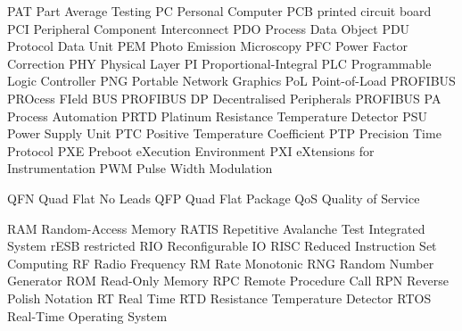 		{PAT}		{Part Average Testing}
			{PC}		{Personal Computer}
		{PCB}		{printed circuit board}
		{PCI}		{Peripheral Component Interconnect}
		{PDO}		{Process Data Object}
		{PDU}		{Protocol Data Unit}
		{PEM}		{Photo Emission Microscopy}
		{PFC}		{Power Factor Correction}
		{PHY}		{Physical Layer}
		{PI}		{Proportional-Integral}
		{PLC}		{Programmable Logic Controller}
		{PNG}		{Portable Network Graphics}
		{PoL}		{Point-of-Load}
	{PROFIBUS}	{PROcess FIeld BUS}
		{PROFIBUS DP}	{{} Decentralised Peripherals}
		{PROFIBUS PA}	{{} Process Automation}
		{PRTD}		{Platinum Resistance Temperature Detector}
		{PSU}		{Power Supply Unit}
		{PTC}		{Positive Temperature Coefficient}
		{PTP}		{Precision Time Protocol}
		{PXE}		{Preboot eXecution Environment}
		{PXI}		{{} eXtensions for Instrumentation}
		{PWM}		{Pulse Width Modulation}

		{QFN}		{Quad Flat No Leads}
		{QFP}		{Quad Flat Package}
		{QoS}		{Quality of Service}

		{RAM}		{Random-Access Memory}
		{RATIS}		{Repetitive Avalanche Test Integrated System}
		{rESB}		{restricted {}}
		{RIO}		{Reconfigurable {\acrshort{IO}}}
		{RISC}		{Reduced Instruction Set Computing}
			{RF}		{Radio Frequency}
			{RM}		{Rate Monotonic}
		{RNG}		{Random Number Generator}
		{ROM}		{Read-Only Memory}
		{RPC}		{Remote Procedure Call}
		{RPN}		{Reverse Polish Notation}
			{RT}		{Real Time}
		{RTD}		{Resistance Temperature Detector}
		{RTOS}		{Real-Time Operating System}

